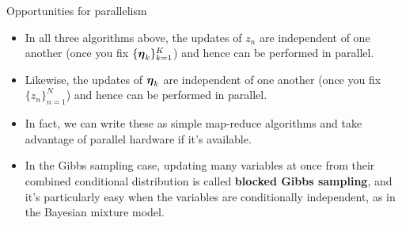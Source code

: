 \documentclass[aspectratio=169]{beamer}
\begin{document}
\begin{frame}{Opportunities for parallelism}
    
\begin{itemize}
    \item In all three algorithms above, the updates of $z_n$ are independent of one another (once you fix $\{\boldsymbol{\eta}_k\}_{k=1}^K$) and hence can be performed in parallel.
    
    \item Likewise, the updates of $\boldsymbol{\eta}_k$ are independent of one another (once you fix $\{z_n\}_{n=1}^N$) and hence can be performed in parallel.
    
    \item In fact, we can write these as simple map-reduce algorithms and take advantage of parallel hardware if it's available.
    
    \item In the Gibbs sampling case, updating many variables at once from their combined conditional distribution is called \textbf{blocked Gibbs sampling}, and it's particularly easy when the variables are conditionally independent, as in the Bayesian mixture model.
\end{itemize}
\end{frame}


\end{document}
